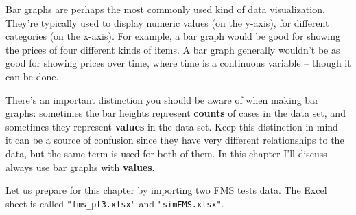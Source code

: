 \documentclass[
]{book}
\begin{document}
Bar graphs are perhaps the most commonly used kind of data visualization. They're typically used to display numeric values (on the y-axis), for different categories (on the x-axis). For example, a bar graph would be good for showing the prices of four different kinds of items. A bar graph generally wouldn't be as good for showing prices over time, where time is a continuous variable -- though it can be done.

There's an important distinction you should be aware of when making bar graphs: sometimes the bar heights represent \textbf{counts} of cases in the data set, and sometimes they represent \textbf{values} in the data set. Keep this distinction in mind -- it can be a source of confusion since they have very different relationships to the data, but the same term is used for both of them. In this chapter I'll discuss always use bar graphs with \textbf{values}.

Let us prepare for this chapter by importing two FMS tests data. The Excel sheet is called \texttt{"fms\_pt3.xlsx"} and \texttt{"simFMS.xlsx"}.
\end{document}
